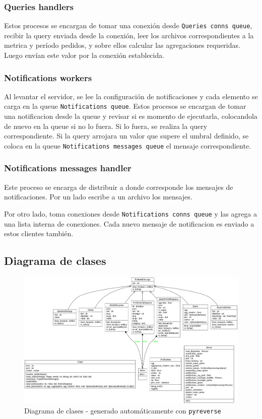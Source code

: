 \documentclass[a4paper,oneside]{article}
\begin{document}
\subsubsection{Queries handlers}
Estos procesos se encargan de tomar una conexión desde \texttt{Queries conns queue}, recibir la query enviada desde la conexión, leer los archivos correspondientes a la metrica y período pedidos, y sobre ellos calcular las agregaciones requeridas. Luego envían este valor por la conexión establecida.

\subsubsection{Notifications workers}
Al levantar el servidor, se lee la configuración de notificaciones y cada elemento se carga en la queue \texttt{Notifications queue}. Estos procesos se encargan de tomar una notificacion desde la queue y revisar si es momento de ejecutarla, colocandola de nuevo en la queue si no lo fuera. Si lo fuera, se realiza la query correspondiente. Si la query arrojara un valor que supere el umbral definido, se coloca en la queue \texttt{Notifications messages queue} el mensaje correspondiente.

\subsubsection{Notifications messages handler}
Este proceso se encarga de distribuir a donde corresponde los mensajes de notificaciones. Por un lado escribe a un archivo los mensajes.

Por otro lado, toma conexiones desde \texttt{Notifications conns queue} y las agrega a una lista interna de conexiones. Cada nuevo mensaje de notificacion es enviado a estos clientes también.

\subsection{Diagrama de clases}
\begin{figure}[H]
\centering
\includegraphics[width=\textwidth]{images/classes.png}
\caption{Diagrama de clases - generado automáticamente con \texttt{pyreverse}}
\end{figure}
\end{document}
